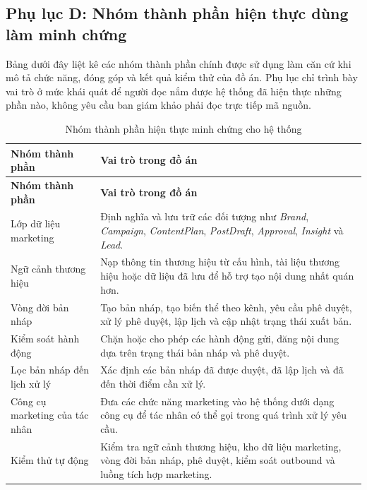 \documentclass[a4paper]{article}
\renewcommand{\arraystretch}{1.25}
\begin{document}
\subsection*{Phụ lục D: Nhóm thành phần hiện thực dùng làm minh chứng}

Bảng dưới đây liệt kê các nhóm thành phần chính được sử dụng làm căn cứ khi mô tả chức năng, đóng góp và kết quả kiểm thử của đồ án. Phụ lục chỉ trình bày vai trò ở mức khái quát để người đọc nắm được hệ thống đã hiện thực những phần nào, không yêu cầu ban giám khảo phải đọc trực tiếp mã nguồn.

\renewcommand{\arraystretch}{1.25}
\begin{longtable}{L{0.34\textwidth}L{0.56\textwidth}}
\caption{Nhóm thành phần hiện thực minh chứng cho hệ thống}\\
\toprule
\textbf{Nhóm thành phần} & \textbf{Vai trò trong đồ án}\\
\midrule
\endfirsthead
\toprule
\textbf{Nhóm thành phần} & \textbf{Vai trò trong đồ án}\\
\midrule
\endhead
Lớp dữ liệu marketing & Định nghĩa và lưu trữ các đối tượng như \textit{Brand}, \textit{Campaign}, \textit{ContentPlan}, \textit{PostDraft}, \textit{Approval}, \textit{Insight} và \textit{Lead}.\\
Ngữ cảnh thương hiệu & Nạp thông tin thương hiệu từ cấu hình, tài liệu thương hiệu hoặc dữ liệu đã lưu để hỗ trợ tạo nội dung nhất quán hơn.\\
Vòng đời bản nháp & Tạo bản nháp, tạo biến thể theo kênh, yêu cầu phê duyệt, xử lý phê duyệt, lập lịch và cập nhật trạng thái xuất bản.\\
Kiểm soát hành động & Chặn hoặc cho phép các hành động gửi, đăng nội dung dựa trên trạng thái bản nháp và phê duyệt.\\
Lọc bản nháp đến lịch xử lý & Xác định các bản nháp đã được duyệt, đã lập lịch và đã đến thời điểm cần xử lý.\\
Công cụ marketing của tác nhân & Đưa các chức năng marketing vào hệ thống dưới dạng công cụ để tác nhân có thể gọi trong quá trình xử lý yêu cầu.\\
Kiểm thử tự động & Kiểm tra ngữ cảnh thương hiệu, kho dữ liệu marketing, vòng đời bản nháp, phê duyệt, kiểm soát outbound và luồng tích hợp marketing.\\
\bottomrule
\end{longtable}
\renewcommand{\arraystretch}{1}
\end{document}
